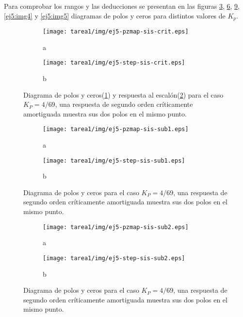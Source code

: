 \begin{ejercicio}
  Para comprobar los rangos y las deducciones se presentan en las figuras \ref{ej5:img1}, \ref{ej5:img2}, \ref{ej5:img3}, \ref{ej5:img4} y \ref{ej5:img5} diagramas de polos y ceros para distintos valores de $K_p$.

    \begin{figure}[H]
      \centering
      \begin{subfigure}{0.48\textwidth}
        \centering
        \texttt{[image: tarea1/img/ej5-pzmap-sis-crit.eps]}
        \caption{a}
        \label{ej5:img1:a}
      \end{subfigure}
      \begin{subfigure}{0.48\textwidth}
        \centering
        \texttt{[image: tarea1/img/ej5-step-sis-crit.eps]}
        \caption{b}
        \label{ej5:img1:b}
      \end{subfigure}
      \caption{Diagrama de polos y ceros(\ref{ej5:img1:a}) y respuesta al escalón(\ref{ej5:img1:b}) para el caso $K_P = 4/69$, una respuesta de segundo orden críticamente amortiguada muestra sus dos polos en el mismo punto.}
      \label{ej5:img1}
    \end{figure}
    
    \begin{figure}[H]
      \centering
      \begin{subfigure}{0.48\textwidth}
        \centering
        \texttt{[image: tarea1/img/ej5-pzmap-sis-sub1.eps]}
        \caption{a}
        \label{ej5:img2:a}
      \end{subfigure}
      \begin{subfigure}{0.48\textwidth}
        \centering
        \texttt{[image: tarea1/img/ej5-step-sis-sub1.eps]}
        \caption{b}
        \label{ej5:img2:b}
      \end{subfigure}
      \caption{Diagrama de polos y ceros para el caso $K_P = 4/69$, una respuesta de segundo orden críticamente amortiguada muestra sus dos polos en el mismo punto.}
      \label{ej5:img2}
    \end{figure}

    \begin{figure}[H]
      \centering
      \begin{subfigure}{0.48\textwidth}
        \centering
        \texttt{[image: tarea1/img/ej5-pzmap-sis-sub2.eps]}
        \caption{a}
        \label{ej5:img3:a}
      \end{subfigure}
      \begin{subfigure}{0.48\textwidth}
        \centering
        \texttt{[image: tarea1/img/ej5-step-sis-sub2.eps]}
        \caption{b}
        \label{ej5:img3:b}
      \end{subfigure}
      \caption{Diagrama de polos y ceros para el caso $K_P = 4/69$, una respuesta de segundo orden críticamente amortiguada muestra sus dos polos en el mismo punto.}
      \label{ej5:img3}
    \end{figure}


\end{ejercicio}

